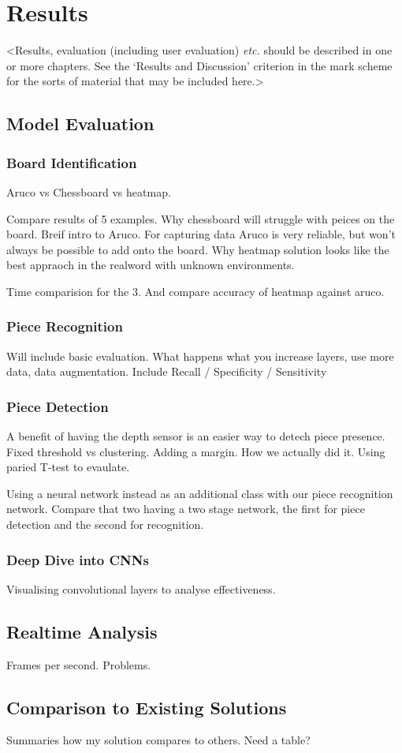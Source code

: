 \chapter{Results}
\label{chapter3}

<Results, evaluation (including user evaluation) {\em etc.} should be described in one or more chapters. See the `Results and Discussion' criterion in the mark scheme for the sorts of material that may be included here.>

\section{Model Evaluation}

\subsection{Board Identification}
Aruco vs Chessboard vs heatmap. 

Compare results of 5 examples.  Why chessboard \cite{} will struggle with peices on the board.
Breif intro to Aruco.  For capturing data Aruco is very reliable, but won't always be possible to add onto the board.
Why heatmap solution looks like the best appraoch in the realword with unknown environments.  \cite{}

Time comparision for the 3.  And compare accuracy of heatmap against aruco.

\subsection{Piece Recognition}
Will include basic evaluation.  What happens what you increase layers, use more data, data augmentation.
Include Recall / Specificity / Sensitivity

\subsection{Piece Detection}
A benefit of having the depth sensor is an easier way to detech piece presence.  
Fixed threshold vs clustering.  Adding a margin.  How we actually did it.
Using paried T-test to evaulate.

Using a neural network instead as an additional class with our piece recognition network.
Compare that two having a two stage network, the first for piece detection and the second for recognition.

\subsection{Deep Dive into CNNs}
Visualising convolutional layers to analyse effectiveness.

\section{Realtime Analysis}
Frames per second.  Problems.

\section{Comparison to Existing Solutions}
Summaries how my solution compares to others.  Need a table?
